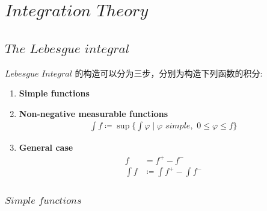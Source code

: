 \chapter{$Integration \,\, Theory$}
\section{$The \,\, Lebesgue \,\, integral$}
	$Lebesgue$ $Integral$ 的构造可以分为三步，分别为构造下列函数的积分:
	\begin{enumerate}
		\item \textbf{Simple functions} 
	
		\item \textbf{Non-negative measurable functions}
		\begin{align}
			\int f \coloneqq \sup{\{ \int \varphi \mid \varphi \,\, simple , \,\, 0 \leq \varphi \leq f \}}
		\end{align}
	
		\item \textbf{General case}
		\begin{align}
			f &= f^{+} - f^{-} \\
			\int f &\coloneqq \int f^{+} - \int f^{-}
		\end{align}
	\end{enumerate}

\subsection{$Simple \,\, functions$}
